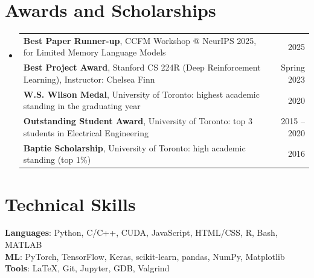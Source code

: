 \documentclass[letterpaper,11pt]{article}
\newcommand{\resumeSubHeadingListStart}{\begin{itemize}[leftmargin=0.15in, label={}]}
\newcommand{\resumeSubHeadingListEnd}{\end{itemize}}
\begin{document}
\section{Awards and Scholarships}
  \resumeSubHeadingListStart
  \vspace{-2pt}\item
     \begin{tabular*}{0.97\textwidth}[t]{l@{\extracolsep{\fill}}r}
      \small\textbf{Best Paper Runner-up}, CCFM Workshop @ NeurIPS 2025, for Limited Memory Language Models & \small 2025 \\
      \small\textbf{Best Project Award}, Stanford CS 224R (Deep Reinforcement Learning), Instructor: Chelsea Finn & \small Spring 2023 \\
      \small\textbf{W.S. Wilson Medal}, University of Toronto: highest academic standing in the graduating year & \small 2020 \\
      \small\textbf{Outstanding Student Award}, University of Toronto: top 3 students in Electrical Engineering & \small 2015 -- 2020 \\
      \small\textbf{Baptie Scholarship}, University of Toronto: high academic standing (top 1\%) & \small 2016 \\
    \end{tabular*}\vspace{0pt}
  \resumeSubHeadingListEnd


\section{Technical Skills}
 \begin{itemize}[leftmargin=0.15in, label={}]
    \small{\item{
     \textbf{Languages}{: Python, C/C++, CUDA, JavaScript, HTML/CSS, R, Bash, MATLAB} \\
     \textbf{ML}{: PyTorch, TensorFlow, Keras, scikit-learn, pandas, NumPy, Matplotlib} \\
     \textbf{Tools}{: \LaTeX, Git, Jupyter, GDB, Valgrind}
    }}
 \end{itemize}
\end{document}
